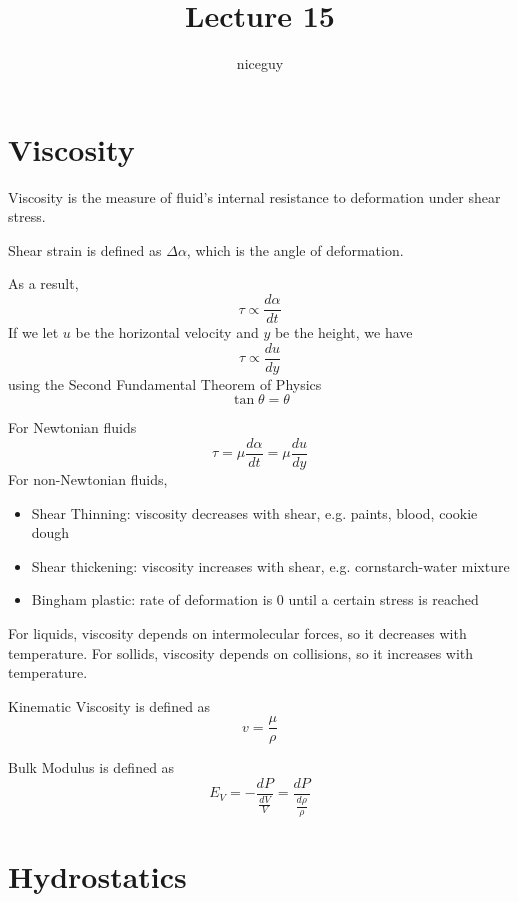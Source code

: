 \documentclass[12pt]{article}
\author{niceguy}
\title{Lecture 15}
\begin{document}
\maketitle

\section{Viscosity}

\begin{defn}
	Viscosity is the measure of fluid's internal resistance to deformation under shear stress.
\end{defn}

\begin{defn}
	Shear strain is defined as $\Delta \alpha$, which is the angle of deformation.
\end{defn}

As a result,
$$\tau \propto \frac{d\alpha}{dt}$$
If we let $u$ be the horizontal velocity and $y$ be the height, we have
$$\tau \propto \frac{du}{dy}$$
using the Second Fundamental Theorem of Physics
$$\tan \theta = \theta$$

For Newtonian fluids
$$\tau = \mu\frac{d\alpha}{dt} = \mu\frac{du}{dy}$$
For non-Newtonian fluids,
\begin{itemize}
	\item Shear Thinning: viscosity decreases with shear, e.g. paints, blood, cookie dough
	\item Shear thickening: viscosity increases with shear, e.g. cornstarch-water mixture
	\item Bingham plastic: rate of deformation is 0 until a certain stress is reached
\end{itemize}

For liquids, viscosity depends on intermolecular forces, so it decreases with temperature. For sollids, viscosity depends on collisions, so it increases with temperature.

\begin{defn}
	Kinematic Viscosity is defined as
	$$v = \frac{\mu}{\rho}$$
\end{defn}

\begin{defn}
	Bulk Modulus is defined as
	$$E_V = -\frac{dP}{\frac{dV}{V}} = \frac{dP}{\frac{d\rho}{\rho}}$$
\end{defn}

\section{Hydrostatics}
\end{document}
